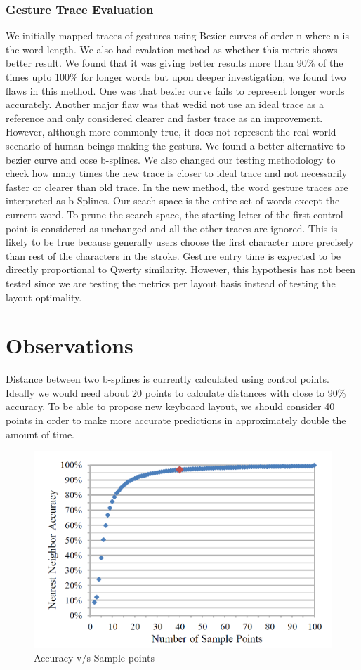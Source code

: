\documentclass[MTech]{iitmdiss}
\begin{document}
\subsection{Gesture Trace Evaluation}
We initially mapped traces of gestures using Bezier curves of order n where n is the word length. We also had evalation method as whether this metric shows better result. We found that it was giving better results more than 90\% of the times upto 100\% for longer words but upon deeper investigation, we found two flaws in this method. One was that bezier curve fails to represent longer words accurately. Another major flaw was that wedid not use an ideal trace as a reference and only considered clearer and faster trace as an improvement. However, although more commonly true, it does not represent the real world scenario of human beings making the gesturs. We found a better alternative to bezier curve and cose b-splines. We also changed our testing methodology to check how many times the new trace is closer to ideal trace and not necessarily faster or clearer than old trace.
In the new method, the word gesture traces are interpreted as b-Splines. Our seach space is the entire set of words except the current word. To prune the search space, the starting letter of the first control point is considered as unchanged and all the other traces are ignored. This is likely to be true because generally users choose the first character more precisely than rest of the characters in the stroke. Gesture entry time is expected to be directly proportional to Qwerty similarity. However, this hypothesis has not been tested since we are testing the metrics per layout basis instead of testing the layout optimality.

\chapter{Observations}
Distance between two b-splines is currently calculated using control points. Ideally we would need about 20 points to calculate distances with close to 90\% accuracy. To be able to propose new keyboard layout, we should consider 40 points in order to make more accurate predictions in approximately double the amount of time.

\begin{figure}[h!]
	\centering
	\includegraphics[scale=0.5]{Images/accuracy}
	\caption{Accuracy v/s Sample points }
\end{figure}
\end{document}
